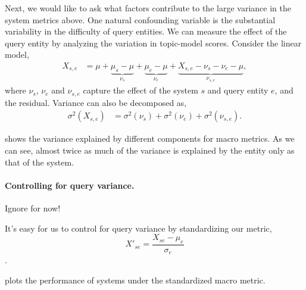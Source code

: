Next, we would like to ask what factors contribute to the large variance in the system metrics above.
One natural confounding variable is the substantial variability in the difficulty of query entities.
We can measure the effect of the query entity by analyzing the variation in topic-model scores.
Consider the linear model, 
\begin{align*}
  X_{s,e} &= \mu 
    + \underbrace{\mu_{s} - \mu}_{\nu_{s}}
    + \underbrace{\mu_{e} - \mu}_{\nu_{e}}
    + \underbrace{X_{s,e} - \nu_{s} - \nu_{e} - \mu}_{\nu_{s,e}},
\end{align*}
where $\nu_{s}$, $\nu_{e}$ and $\nu_{s,e}$ capture the effect of the system $s$ and query entity $e$, and the residual.
Variance can also be decomposed as,
\begin{align*}
  \sigma^2(X_{s,e}) &= \sigma^2(\nu_s) + \sigma^2(\nu_e) + \sigma^2(\nu_{s,e}).
\end{align*}

\tableref{} shows the variance explained by different components for macro metrics. As we can see, almost twice as much of the variance is explained by the entity only as that of the system.


\paragraph{Controlling for query variance.}
\ac{Ignore for now!}

It's easy for us to control for query variance by standardizing our metric,  
$$X'_{se} = \frac{X_{se} - \mu_e}{\sigma_e}$$.

 plots the performance of systems under the standardized macro \fone metric.


